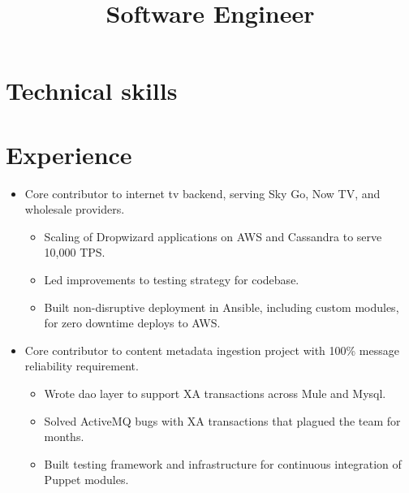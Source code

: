 \documentclass[11pt,a4paper,roman]{moderncv}
\title{Software Engineer}
\begin{document}
\makecvtitle

\section{Technical skills}

\section{Experience}

\begin{itemize}
\item Core contributor to internet tv backend, serving Sky Go, Now TV, and wholesale providers.
  \begin{itemize}
  \item Scaling of Dropwizard applications on AWS and Cassandra to serve 10,000 TPS.
  \item Led improvements to testing strategy for codebase.
  \item Built non-disruptive deployment in Ansible, including custom modules, for zero downtime deploys to AWS.
  \end{itemize}
\vspace{1mm}
\item Core contributor to content metadata ingestion project with 100\% message reliability requirement.
  \begin{itemize}
  \item Wrote dao layer to support XA transactions across Mule and Mysql.
  \item Solved ActiveMQ bugs with XA transactions that plagued the team for months.
  \item Built testing framework and infrastructure for continuous integration of Puppet modules.
  \end{itemize}
\end{itemize}

\vspace{5mm}
\end{document}
